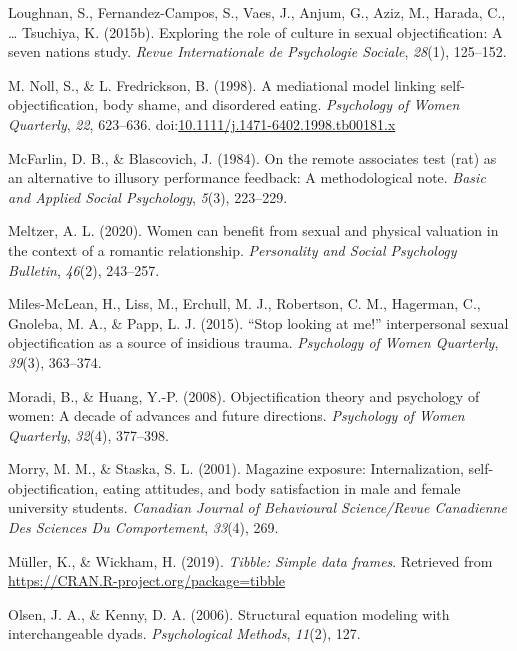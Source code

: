 \documentclass[man]{apa6}
\begin{document}
\hypertarget{ref-loughnan2015}{}
Loughnan, S., Fernandez-Campos, S., Vaes, J., Anjum, G., Aziz, M.,
Harada, C., \ldots{} Tsuchiya, K. (2015b). Exploring the role of culture
in sexual objectification: A seven nations study. \emph{Revue
Internationale de Psychologie Sociale}, \emph{28}(1), 125--152.

\hypertarget{ref-nollfredrickson1998}{}
M. Noll, S., \& L. Fredrickson, B. (1998). A mediational model linking
self-objectification, body shame, and disordered eating.
\emph{Psychology of Women Quarterly}, \emph{22}, 623--636.
doi:\href{https://doi.org/10.1111/j.1471-6402.1998.tb00181.x}{10.1111/j.1471-6402.1998.tb00181.x}

\hypertarget{ref-mcfarlin1984remote}{}
McFarlin, D. B., \& Blascovich, J. (1984). On the remote associates test
(rat) as an alternative to illusory performance feedback: A
methodological note. \emph{Basic and Applied Social Psychology},
\emph{5}(3), 223--229.

\hypertarget{ref-meltzer2020women}{}
Meltzer, A. L. (2020). Women can benefit from sexual and physical
valuation in the context of a romantic relationship. \emph{Personality
and Social Psychology Bulletin}, \emph{46}(2), 243--257.

\hypertarget{ref-miles2015stop}{}
Miles-McLean, H., Liss, M., Erchull, M. J., Robertson, C. M., Hagerman,
C., Gnoleba, M. A., \& Papp, L. J. (2015). ``Stop looking at me!''
interpersonal sexual objectification as a source of insidious trauma.
\emph{Psychology of Women Quarterly}, \emph{39}(3), 363--374.

\hypertarget{ref-moradi2008}{}
Moradi, B., \& Huang, Y.-P. (2008). Objectification theory and
psychology of women: A decade of advances and future directions.
\emph{Psychology of Women Quarterly}, \emph{32}(4), 377--398.

\hypertarget{ref-morry2001magazine}{}
Morry, M. M., \& Staska, S. L. (2001). Magazine exposure:
Internalization, self-objectification, eating attitudes, and body
satisfaction in male and female university students. \emph{Canadian
Journal of Behavioural Science/Revue Canadienne Des Sciences Du
Comportement}, \emph{33}(4), 269.

\hypertarget{ref-R-tibble}{}
Müller, K., \& Wickham, H. (2019). \emph{Tibble: Simple data frames}.
Retrieved from \url{https://CRAN.R-project.org/package=tibble}

\hypertarget{ref-olsen2006structural}{}
Olsen, J. A., \& Kenny, D. A. (2006). Structural equation modeling with
interchangeable dyads. \emph{Psychological Methods}, \emph{11}(2), 127.
\end{document}
